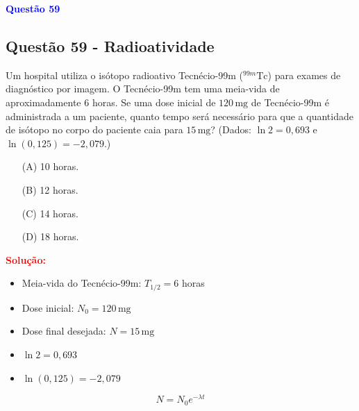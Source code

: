 \begin{flushleft}
\textbf{\textcolor{blue}{\Large Quest\~ao 59}}\\
\noindent
\subsection{Quest\~ao 59 - Radioatividade}
Um hospital utiliza o isótopo radioativo Tecnécio-99m (\(^{99m}\mathrm{Tc}\)) para exames de diagnóstico por imagem.  
O Tecnécio-99m tem uma meia-vida de aproximadamente \(6\) horas. Se uma dose inicial de \(120\,\mathrm{mg}\) de Tecnécio-99m é 
administrada a um paciente, quanto tempo será necessário para que a quantidade de isótopo no corpo do paciente caia para \(15\,\mathrm{mg}\)?
(Dados: \(\ln 2 = 0{,}693\) e \(\ln(0{,}125) = -2{,}079\).)

\begin{itemize}
\item[(A)] 10 horas.
\item[(B)] 12 horas.
\item[(C)] 14 horas.
\item[(D)] 18 horas.
\end{itemize}

\vspace{0.5cm}

\textcolor{red}{\textbf{Solução:}}\\


\begin{itemize}
    \item Meia-vida do Tecnécio-99m: \( T_{1/2} = 6 \) horas
    \item Dose inicial: \( N_0 = 120\,\mathrm{mg} \)
    \item Dose final desejada: \( N = 15\,\mathrm{mg} \)
    \item \(\ln 2 = 0{,}693\)
    \item \(\ln(0{,}125) = -2{,}079\)
\end{itemize}

\vspace{0.3cm}


\[
N = N_0 e^{-\lambda t}
\]


\vspace{0.3cm}



\end{flushleft}
